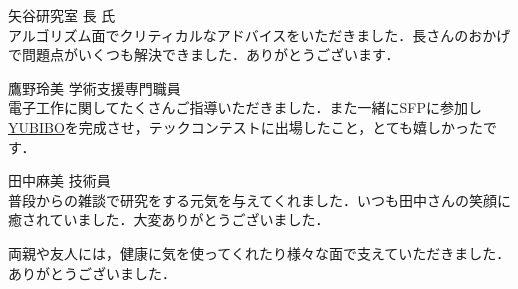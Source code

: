 矢谷研究室 長 氏\\
アルゴリズム面でクリティカルなアドバイスをいただきました．長さんのおかげで問題点がいくつも解決できました．ありがとうございます．

鷹野玲美 学術支援専門職員\\
電子工作に関してたくさんご指導いただきました．また一緒にSFPに参加し\href{https://qiita.com/yumion/items/b7fa89f29504cab1f123}{YUBIBO}を完成させ，テックコンテストに出場したこと，とても嬉しかったです．

田中麻美 技術員\\
普段からの雑談で研究をする元気を与えてくれました．いつも田中さんの笑顔に癒されていました．大変ありがとうございました．

\vspace{12pt}
両親や友人には，健康に気を使ってくれたり様々な面で支えていただきました．ありがとうございました．
